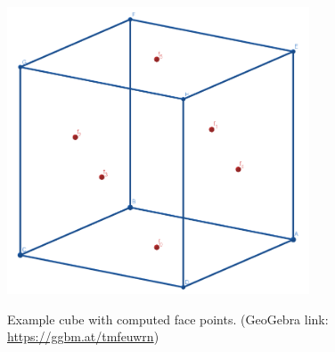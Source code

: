 \documentclass{article}
\begin{document}
\begin{figure}[H]
\caption{Example cube with computed face points. (GeoGebra link: \href{https://ggbm.at/tmfeuwrn}{https://ggbm.at/tmfeuwrn})}
\centering
\includegraphics[width=0.8\textwidth]{images/cl-02.png}
\label{fig:cube2}
\end{figure}
\end{document}
